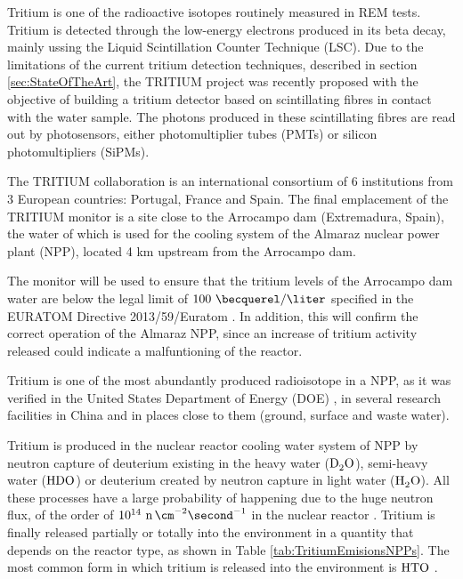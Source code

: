 Tritium is one of the radioactive isotopes routinely measured in REM tests. Tritium is detected through the low-energy electrons produced in its beta decay, mainly ussing the Liquid Scintillation Counter Technique (LSC). Due to the limitations of the current tritium detection techniques, described in section \ref{sec:StateOfTheArt}, the TRITIUM project was recently proposed with the objective of building a tritium detector based on scintillating fibres in contact with the water sample. The photons produced in these scintillating fibres are read out by photosensors, either photomultiplier tubes (PMTs) or silicon photomultipliers (SiPMs). 

The TRITIUM collaboration is an international consortium of 6 institutions from 3 European countries: Portugal, France and Spain. The final emplacement of the TRITIUM monitor is a site close to the Arrocampo dam (Extremadura, Spain), the water of which is used for the cooling system of the Almaraz nuclear power plant (NPP), located 4 km upstream from the Arrocampo dam.

The monitor will be used to ensure that the tritium levels of the Arrocampo dam  water are below the legal limit of $100~\becquerel/\liter$ specified in the EURATOM Directive 2013/59/Euratom \cite{100BqL}. In addition, this will confirm the correct operation of the Almaraz NPP, since an increase of tritium activity released could indicate a malfuntioning of the reactor.

Tritium is one of the most abundantly produced radioisotope in a NPP, as it was verified in the United States Department of Energy (DOE) \cite{FiberDetector1a, FiberDetector1b}, in several research facilities in China \cite{CommonEmissionTritium} and in places close to them (ground, surface and waste water).

Tritium is produced in the nuclear reactor cooling water system of NPP by neutron capture of deuterium existing in the heavy water ($\ce{D_2 O}$), semi-heavy water ($\ce{H D O}$) or deuterium created by neutron capture in light water ($\ce{H_2 O}$). All these processes have a large probability of happening due to the huge neutron flux, of the order of $10^{14} ~\ce{n} \, \cm^{-2} \second^{-1}$ in the nuclear reactor \cite{CrossSeccionNeutrons}. Tritium is finally released partially or totally into the environment in a quantity that depends on the reactor type, as shown in Table \ref{tab:TritiumEmisionsNPPs}. The most common form in which tritium is released into the environment is $\ce{HTO}$ \cite{CommonEmissionTritium}.

